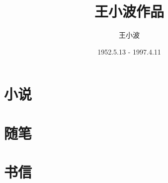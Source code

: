 \documentclass[oneside,a4paper,12pt]{book}
\begin{document}
\frontmatter
  \title{王小波作品}
  \author{王小波}
  \date{1952.5.13 - 1997.4.11}
  \maketitle
  \newcommand\CJKprechaptername{第}
  \newcommand\CJKchaptername{号作品}
  \renewcommand{\chaptermark}[1]{\markboth{\CJKprechaptername~\thechapter~\CJKchaptername\  #1}{}}
  \renewcommand\chaptername{\CJKprechaptername~\thechapter~\CJKchaptername}
  \renewcommand{\contentsname}{目\hspace{1em}录} 

  
  \tableofcontents
  \setcounter{secnumdepth}{1}
  \part{小说}
  \mainmatter
  
  
  
  
  
  
  
  
  
  
  
  
  
  
  
  
  
  
  
  
  
  
  
  
  
  
  
  \part{随笔}
  
  \part{书信}
  
  \backmatter
\end{document}
